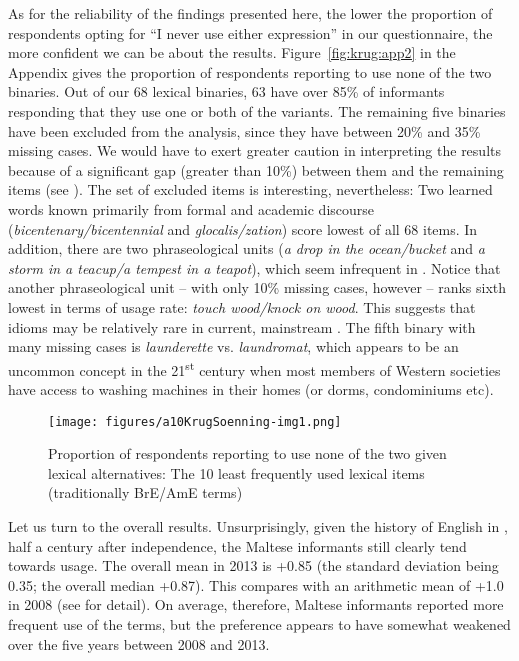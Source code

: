 \documentclass[output=paper]{langsci/langscibook}
\begin{document}
As for the reliability of the findings presented here, the lower the proportion of respondents opting for “I never use either expression” in our questionnaire, the more confident we can be about the results. %
Figure~\ref{fig:krug:app2} in the Appendix gives the proportion of respondents reporting to use none of the two binaries. Out of our 68 lexical binaries, 63 have over 85\% of informants responding that they use one or both of the variants. The remaining five binaries have been excluded from the analysis, since they have between 20\% and 35\% missing cases. We would have to exert greater caution in interpreting the results because of a significant gap (greater than 10\%) between them and the remaining items (see ). The set of excluded items is interesting, nevertheless: Two learned words known primarily from formal and academic discourse (\textit{bicentenary/bicentennial} and \textit{glocalis/zation}) score lowest of all 68 items. In addition, there are two phraseological units (\textit{a drop in the ocean/bucket} and \textit{a storm in a teacup/a tempest in a teapot}), which seem infrequent in . Notice that another phraseological unit – with only 10\% missing cases, however – ranks sixth lowest in terms of usage rate: \textit{touch wood/knock on wood}. This suggests that idioms may be relatively rare in current, mainstream . The fifth binary with many missing cases is \textit{launderette} vs. \textit{laundromat}, which appears to be an uncommon concept in the 21\textsuperscript{st} century when most members of Western societies have access to washing machines in their homes (or dorms, condominiums etc). 

  
\begin{figure}
\texttt{[image: figures/a10KrugSoenning-img1.png]}
\caption{Proportion of respondents reporting to use none of the two given lexical alternatives: The 10 least frequently used lexical items (traditionally BrE/AmE terms)}
\label{fig:krug:1}
\end{figure}

Let us turn to the overall results. Unsurprisingly, given the history of English in , half a century after independence, the Maltese informants still clearly tend towards  usage. The overall mean in 2013 is +0.85 (the standard deviation being 0.35; the overall median +0.87). This compares with an arithmetic mean of +1.0 in 2008 (see \citealt{KrugRosen2012} for detail). On average, therefore, Maltese informants reported more frequent use of the  terms, but the preference appears to have somewhat weakened over the five years between 2008 and 2013. 
\end{document}
